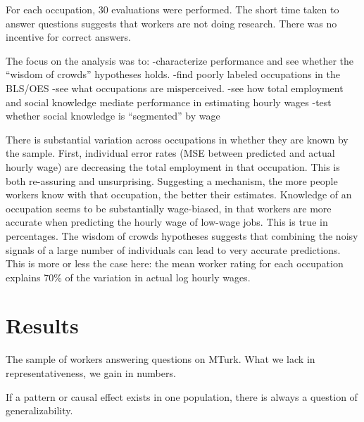\documentclass[11pt]{article}
\begin{document}
For each occupation, 30 evaluations were performed. 
The short time taken to answer questions suggests that workers are not doing research. 
There was no incentive for correct answers. 

The focus on the analysis was to:
-characterize performance and see whether the ``wisdom of crowds'' hypotheses holds.
-find poorly labeled occupations in the BLS/OES 
-see what occupations are misperceived. 
-see how total employment and social knowledge mediate performance in estimating hourly wages 
-test whether social knowledge is ``segmented'' by wage  

There is substantial variation across occupations in whether they are known by the sample. 
First, individual error rates (MSE between predicted and actual hourly wage) are decreasing the total employment in that occupation. 
This is both re-assuring and unsurprising. 
Suggesting a mechanism, the more people workers know with that occupation, the better their estimates.  
Knowledge of an occupation seems to be substantially wage-biased, in that workers are more accurate when predicting the hourly wage of low-wage jobs. 
This is true in percentages.  
The wisdom of crowds hypotheses suggests that combining the noisy signals of a large number of individuals can lead to very accurate predictions. 
This is more or less the case here: the mean worker rating for each occupation explains 70\% of the variation in actual log hourly wages.  



\section{Results}

The sample of workers answering questions on MTurk. 
What we lack in representativeness, we gain in numbers. 

If a pattern or causal effect exists in one population, there is always a question of generalizability. 
\end{document}
